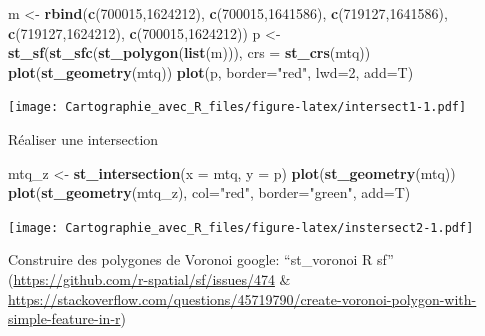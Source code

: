 \documentclass[]{book}
\newenvironment{Shaded}{\begin{snugshade}}{\end{snugshade}}
\newcommand{\DataTypeTok}[1]{\textcolor[rgb]{0.13,0.29,0.53}{#1}}
\newcommand{\DecValTok}[1]{\textcolor[rgb]{0.00,0.00,0.81}{#1}}
\newcommand{\KeywordTok}[1]{\textcolor[rgb]{0.13,0.29,0.53}{\textbf{#1}}}
\newcommand{\NormalTok}[1]{#1}
\newcommand{\StringTok}[1]{\textcolor[rgb]{0.31,0.60,0.02}{#1}}
\begin{document}
\begin{Shaded}
\begin{Highlighting}[]
\NormalTok{m <-}\StringTok{ }\KeywordTok{rbind}\NormalTok{(}\KeywordTok{c}\NormalTok{(}\DecValTok{700015}\NormalTok{,}\DecValTok{1624212}\NormalTok{), }\KeywordTok{c}\NormalTok{(}\DecValTok{700015}\NormalTok{,}\DecValTok{1641586}\NormalTok{), }\KeywordTok{c}\NormalTok{(}\DecValTok{719127}\NormalTok{,}\DecValTok{1641586}\NormalTok{), }\KeywordTok{c}\NormalTok{(}\DecValTok{719127}\NormalTok{,}\DecValTok{1624212}\NormalTok{), }\KeywordTok{c}\NormalTok{(}\DecValTok{700015}\NormalTok{,}\DecValTok{1624212}\NormalTok{))}
\NormalTok{p <-}\StringTok{ }\KeywordTok{st_sf}\NormalTok{(}\KeywordTok{st_sfc}\NormalTok{(}\KeywordTok{st_polygon}\NormalTok{(}\KeywordTok{list}\NormalTok{(m))), }\DataTypeTok{crs =} \KeywordTok{st_crs}\NormalTok{(mtq))}
\KeywordTok{plot}\NormalTok{(}\KeywordTok{st_geometry}\NormalTok{(mtq))}
\KeywordTok{plot}\NormalTok{(p, }\DataTypeTok{border=}\StringTok{"red"}\NormalTok{, }\DataTypeTok{lwd=}\DecValTok{2}\NormalTok{, }\DataTypeTok{add=}\NormalTok{T)}
\end{Highlighting}
\end{Shaded}

\texttt{[image: Cartographie\_avec\_R\_files/figure-latex/intersect1-1.pdf]}

Réaliser une intersection

\begin{Shaded}
\begin{Highlighting}[]
\NormalTok{mtq_z <-}\StringTok{ }\KeywordTok{st_intersection}\NormalTok{(}\DataTypeTok{x =}\NormalTok{ mtq, }\DataTypeTok{y =}\NormalTok{ p)}
\KeywordTok{plot}\NormalTok{(}\KeywordTok{st_geometry}\NormalTok{(mtq))}
\KeywordTok{plot}\NormalTok{(}\KeywordTok{st_geometry}\NormalTok{(mtq_z), }\DataTypeTok{col=}\StringTok{"red"}\NormalTok{, }\DataTypeTok{border=}\StringTok{"green"}\NormalTok{, }\DataTypeTok{add=}\NormalTok{T)}
\end{Highlighting}
\end{Shaded}

\texttt{[image: Cartographie\_avec\_R\_files/figure-latex/instersect2-1.pdf]}

Construire des polygones de Voronoi
google: ``st\_voronoi R sf'' (\url{https://github.com/r-spatial/sf/issues/474} \& \url{https://stackoverflow.com/questions/45719790/create-voronoi-polygon-with-simple-feature-in-r})
\end{document}
